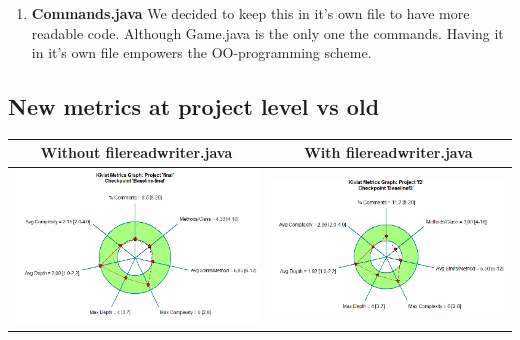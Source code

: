 \documentclass{article}
\begin{document}
\begin{enumerate}
\item%
\textbf{Commands.java}
We decided to keep this in it's own file to have more readable code. Although Game.java is the only one the commands. Having it in it's own file empowers the OO-programming scheme.

\end{enumerate}


\subsection{New metrics at project level vs old} %
\hspace*{-2.6cm}\begin{tabulary}{0.5\textwidth}{| c | c |}
 \hline
Without filereadwriter.java & With filereadwriter.java \\ \hline
\includegraphics[scale=0.5]{Project-after-with-filereadwriter.png} & \includegraphics[scale=0.5]{Kiviat-project-without-filereadwriter.png} \\ \hline
\end{tabulary}
\end{document}
